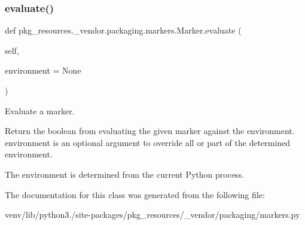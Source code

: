 \subsubsection{\texorpdfstring{evaluate()}{evaluate()}}
{\footnotesize\ttfamily def pkg\+\_\+resources.\+\_\+vendor.\+packaging.\+markers.\+Marker.\+evaluate (\begin{DoxyParamCaption}\item[{}]{self,  }\item[{}]{environment = {\ttfamily None} }\end{DoxyParamCaption})}

\begin{DoxyVerb}Evaluate a marker.

Return the boolean from evaluating the given marker against the
environment. environment is an optional argument to override all or
part of the determined environment.

The environment is determined from the current Python process.
\end{DoxyVerb}
 

The documentation for this class was generated from the following file\+:\begin{DoxyCompactItemize}
\item 
venv/lib/python3./site-\/packages/pkg\+\_\+resources/\+\_\+vendor/packaging/markers.\+py\end{DoxyCompactItemize}
